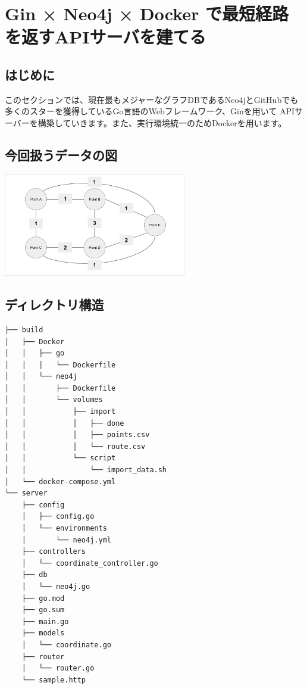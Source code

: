 
\chapter{Gin × Neo4j × Docker で最短経路を返すAPIサーバを建てる}
\section{はじめに}
このセクションでは、現在最もメジャーなグラフDBであるNeo4jとGitHubでも多くのスターを獲得しているGo言語のWebフレームワーク、Ginを用いて
APIサーバーを構築していきます。また、実行環境統一のためDockerを用います。

\section{今回扱うデータの図}
\includegraphics[width=8cm]{./image/03-Tech/chap3/sample_node.png}

\section{ディレクトリ構造}
\begin{tcolorbox}[title=ディレクトリ構造]
    \begin{verbatim}
├── build
│   ├── Docker
│   │   ├── go
│   │   │   └── Dockerfile
│   │   └── neo4j
│   │       ├── Dockerfile
│   │       └── volumes
│   │           ├── import
│   │           │   ├── done
│   │           │   ├── points.csv
│   │           │   └── route.csv
│   │           └── script
│   │               └── import_data.sh
│   └── docker-compose.yml
└── server
    ├── config
    │   ├── config.go
    │   └── environments
    │       └── neo4j.yml
    ├── controllers
    │   └── coordinate_controller.go
    ├── db
    │   └── neo4j.go
    ├── go.mod
    ├── go.sum
    ├── main.go
    ├── models
    │   └── coordinate.go
    ├── router
    │   └── router.go
    └── sample.http
\end{verbatim}
\end{tcolorbox}

